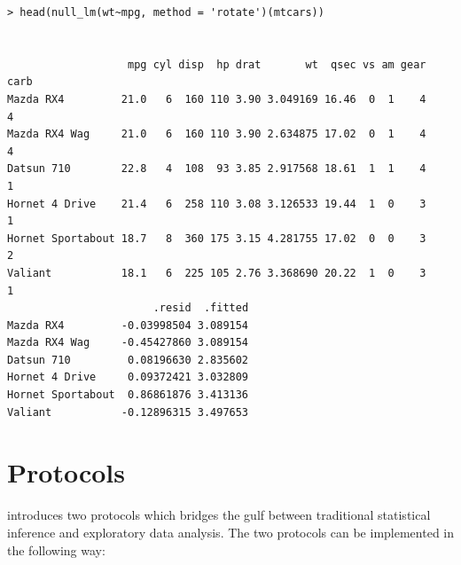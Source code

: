 \documentclass[article]{jss}
\begin{document}
%

\begin{verbatim}
> head(null_lm(wt~mpg, method = 'rotate')(mtcars))


                   mpg cyl disp  hp drat       wt  qsec vs am gear carb
Mazda RX4         21.0   6  160 110 3.90 3.049169 16.46  0  1    4    4
Mazda RX4 Wag     21.0   6  160 110 3.90 2.634875 17.02  0  1    4    4
Datsun 710        22.8   4  108  93 3.85 2.917568 18.61  1  1    4    1
Hornet 4 Drive    21.4   6  258 110 3.08 3.126533 19.44  1  0    3    1
Hornet Sportabout 18.7   8  360 175 3.15 4.281755 17.02  0  0    3    2
Valiant           18.1   6  225 105 2.76 3.368690 20.22  1  0    3    1
                       .resid  .fitted
Mazda RX4         -0.03998504 3.089154
Mazda RX4 Wag     -0.45427860 3.089154
Datsun 710         0.08196630 2.835602
Hornet 4 Drive     0.09372421 3.032809
Hornet Sportabout  0.86861876 3.413136
Valiant           -0.12896315 3.497653
\end{verbatim}

\section{Protocols}\label{protocols}

\cite{buja:2009} introduces two protocols which bridges the gulf between traditional statistical inference and exploratory data analysis. The two protocols can be implemented in the following way:
\end{document}
